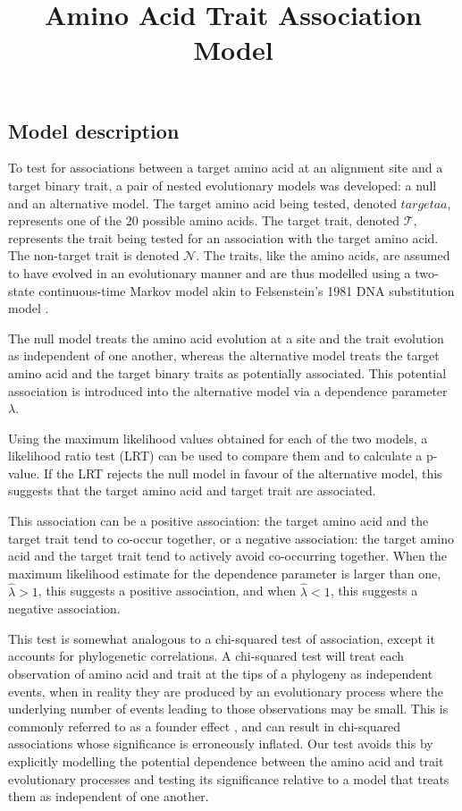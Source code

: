 \documentclass[]{article}
\title{Amino Acid Trait Association Model}
\date{}
\begin{document}
\maketitle

\subsection*{Model description}
To test for associations between a target amino acid at an alignment site and a target binary trait, a pair of nested evolutionary models was developed: a null and an alternative model. The target amino acid being tested, denoted $targetaa$, represents one of the 20 possible amino acids. The target trait, denoted $\mathcal{T}$, represents the trait being tested for an association with the target amino acid. The non-target trait is denoted $\mathcal{N}$. The traits, like the amino acids, are assumed to have evolved in an evolutionary manner and are thus modelled using a two-state continuous-time Markov model akin to Felsenstein's 1981 DNA substitution model \citep{felsenstein1981evolutionary}.

The null model treats the amino acid evolution at a site and the trait evolution as independent of one another, whereas the alternative model treats the target amino acid and the target binary traits as potentially associated. This potential association is introduced into the alternative model via a dependence parameter $\lambda$. 

Using the maximum likelihood values obtained for each of the two models, a likelihood ratio test (LRT) can be used to compare them and to calculate a p-value. If the LRT rejects the null model in favour of the alternative model, this suggests that the target amino acid and target trait are associated. 

This association can be a positive association: the target amino acid and the target trait tend to co-occur together, or a negative association: the target amino acid and the target trait tend to actively avoid co-occurring together. When the maximum likelihood estimate for the dependence parameter is larger than one, $\hat{\lambda}>1$, this suggests a positive association, and when $\hat{\lambda}<1$, this suggests a negative association.

This test is somewhat analogous to a chi-squared test of association, except it accounts for phylogenetic correlations. A chi-squared test will treat each observation of amino acid and trait at the tips of a phylogeny as independent events, when in reality they are produced by an evolutionary process where the underlying number of events leading to those observations may be small. This is commonly referred to as a founder effect \citep{bhattacharya2007founder}, and can result in chi-squared associations whose significance is erroneously inflated. Our test avoids this by explicitly modelling the potential dependence between the amino acid and trait evolutionary processes and testing its significance relative to a model that treats them as independent of one another.
\end{document}

